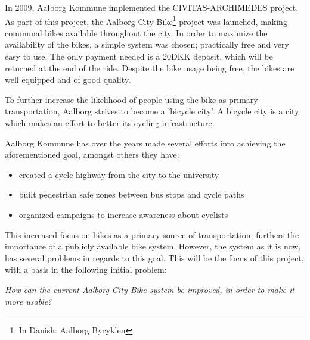In 2009, Aalborg Kommune implemented the CIVITAS-ARCHIMEDES project.\cite{aalborgbycyklenbagcyklen}
As part of this project, the Aalborg City Bike\footnote{In Danish: Aalborg Bycyklen} project was launched, making communal bikes available throughout the city.
In order to maximize the availability of the bikes, a simple system was chosen; practically free and very easy to use.
The only payment needed is a 20DKK deposit, which will be returned at the end of the ride.
Despite the bike usage being free, the bikes are well equipped and of good quality.\cite{cykelplanlaegning}

To further increase the likelihood of people using the bike as primary transportation, Aalborg strives to become a 'bicycle city'.
A bicycle city is a city which makes an effort to better its cycling infrastructure.\cite{cykelhandlingsplan}

Aalborg Kommune has over the years  made several efforts into achieving the aforementioned goal, amongst others they have:
\begin{itemize}
\item created a cycle highway from the city to the university\cite{cykelhandlingsplan}
\item built pedestrian safe zones between bus stops and cycle paths\cite{pedestriansafezone}
\item organized campaigns to increase awareness about cyclists\cite{cykelbycampaigns}
\end{itemize}

This increased focus on bikes as a primary source of transportation, furthers the importance of a publicly available bike system.
However, the system as it is now, has several problems in regards to this goal.
This will be the focus of this project, with a basis in the following initial problem:

\begin{center}
\textit{How can the current Aalborg City Bike system be improved, in order to make it more usable?}
\end{center}